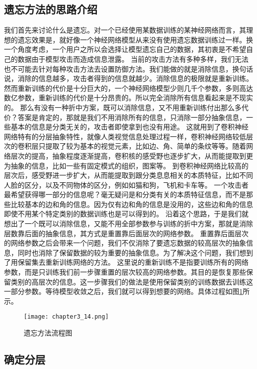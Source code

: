 \subsection{遗忘方法的思路介绍}
我们首先来讨论什么是遗忘。对一个已经使用某数据训练的某神经网络而言，其理想的遗忘效果是，就好像一个神经网络模型从来没有使用遗忘数据训练过一样。换一个角度考虑，一个用户之所以会选择让模型遗忘自己的数据，其初衷是不希望自己的数据由于模型攻击而造成信息泄露。
当前的攻击方法有多种多样，我们无法也不可能去针对每种攻击方法去设置防御方法。我们能做的就是消除信息，换句话说，消除的信息越多，攻击者得到的信息就越少。消除信息的极限就是重新训练。
然而重新训练的代价是十分巨大的，一个神经网络模型少则几千个参数，多则高达数亿参数，重新训练的代价是十分昂贵的。所以完全消除所有信息看起来是不现实的。
那么有没有一种折中方案，既可以消除信息，又不用重新训练付出那么多代价？答案是肯定的，那就是我们不用消除所有的信息，只消除一部分抽象信息，一些基本的信息是分类无关的，攻击者即使拿到也没有用途。
这就用到了卷积神经网络特有的分层抽象特性，就像人类视觉信息处理过程一样，卷积神经网络较低层次的卷积层只提取了较为基本的视觉元素，比如边、角、简单的条纹等等。随着网络层次的提高，抽象程度逐渐提高，卷积核的感受野也逐步扩大，从而能提取到更为抽象的信息，比如一些有固定模式的组织，图案等。
到卷积神经网络比较高的层次后，感受野进一步扩大，从而能提取到跟分类息息相关的本质特征，比如不同人脸的区分，以及不同物体的区分，例如如猫和狗，飞机和卡车等。
一个攻击者最希望获得哪一部分的信息呢？毫无疑问是和分类有关的本质特征信息，而不是那些比较基本的边和角的信息。因为仅有边和角的信息是没用的，这些边和角的信息即使不用某个特定类别的数据训练也是可以得到的。
沿着这个思路，于是我们就想出了一个既可以消除信息，又能不用全部参数参与训练的折中方案，那就是消除层数靠后面的抽象信息，其方式是重置靠后面层次的网络参数。
重置靠后面层次的网络参数之后会带来一个问题，我们不仅消除了要遗忘数据的较高层次的抽象信息，同时也消除了保留数据的较为重要的抽象信息。为了解决这个问题，我们想到了用保留集去重新训练网络的方法。
这里说的重新训练不是指要训练所有的网络参数，而是只训练我们前一步骤重置的层次较高的网络参数。其目的是恢复那些保留类别的高层次的信息。这一步骤我们的做法是使用保留类别的训练数据去训练这一部分参数。等待模型收敛之后，我们就可以得到想要的网络。具体过程如图\ref{fig:chapter3_14}所示。
\begin{figure}
    \centering
    \texttt{[image: chapter3\_14.png]}
    \caption{遗忘方法流程图}
    \label{fig:chapter3_14}
\end{figure}

\subsection{确定分层}

